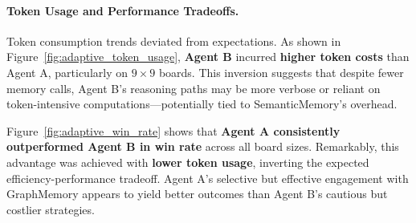 \documentclass[10pt]{article}
\begin{document}
\paragraph{Token Usage and Performance Tradeoffs.}
Token consumption trends deviated from expectations. As shown in Figure~\ref{fig:adaptive_token_usage}, \textbf{Agent B} incurred \textbf{higher token costs} than Agent A, particularly on $9\times9$ boards. This inversion suggests that despite fewer memory calls, Agent B's reasoning paths may be more verbose or reliant on token-intensive computations—potentially tied to SemanticMemory's overhead.

Figure~\ref{fig:adaptive_win_rate} shows that \textbf{Agent A consistently outperformed Agent B in win rate} across all board sizes. Remarkably, this advantage was achieved with \textbf{lower token usage}, inverting the expected efficiency-performance tradeoff. Agent A's selective but effective engagement with GraphMemory appears to yield better outcomes than Agent B's cautious but costlier strategies.
\end{document}
